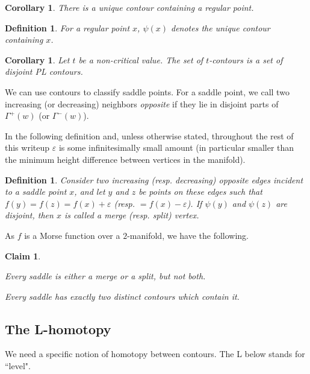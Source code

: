 \documentclass[11pt]{article}
\newtheorem{claim}[theorem]{Claim}
\newtheorem{corollary}[theorem]{Corollary}
\newtheorem{definition}[theorem]{Definition}
\theoremstyle{definition}
\newcommand{\eps}{\varepsilon}
\newcommand{\cont}{\psi}
\begin{document}
{\begin{corollary}
There is a unique contour containing a regular point.
\end{corollary}

\begin{definition} \label{def:p-cont}
For a regular point $x$, $\cont(x)$ denotes the unique contour containing $x$.
\end{definition}


\begin{corollary} \label{cor:cont} Let $t$ be a non-critical value. The set of $t$-contours is a set
of disjoint PL contours.
\end{corollary}

We can use contours to classify saddle points. For a saddle point, we call two increasing (or decreasing) neighbors \emph{opposite}
if they lie in disjoint parts of $\Gamma^+(w)$ (or $\Gamma^-(w)$).

In the following definition and, unless otherwise stated, throughout the rest of this writeup $\eps$ is some infinitesimally small amount
(in particular smaller than the minimum height difference between vertices in the manifold).

\begin{definition} \label{def:merge} Consider two increasing (resp. decreasing) opposite edges incident to a saddle point $x$,
and let $y$ and $z$ be points on these edges such that $f(y) = f(z) = f(x) + \eps$ (resp. $=f(x) - \eps$).
If $\cont(y)$ and $\cont(z)$ are disjoint, then $x$ is called a \emph{merge} (resp. \emph{split}) vertex.
\end{definition}

As $f$ is a Morse function over a $2$-manifold, we have the following.

\begin{claim} \label{clm:saddle} 
  \begin{compactenum}[(1)]
    \item Every saddle is either a merge or a split, but not both.
    \item Every saddle has exactly two distinct contours which contain it.
  \end{compactenum}
\end{claim}


\subsection{The L-homotopy} \label{sec:l-hom}
We need a specific notion of homotopy between contours. The L below stands for ``level".

}
\end{document}
